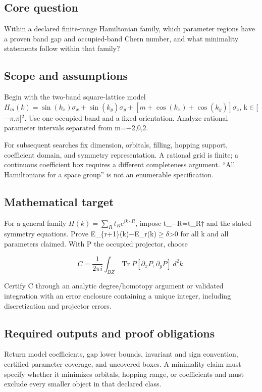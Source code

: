 \documentclass[
  11pt,
]{article}
\begin{document}
\subsection{Core question}

Within a declared finite-range Hamiltonian family, which parameter
regions have a proven band gap and occupied-band Chern number, and what
minimality statements follow within that family?

\subsection{Scope and assumptions}

Begin with the two-band square-lattice model
\(H_m(k)=\sin(k_x)\sigma_x+\sin(k_y)\sigma_y+[m+\cos(k_x)+\cos(k_y)]\sigma_z\),
k\ensuremath{\in}[\ensuremath{-}\ensuremath{\pi},\ensuremath{\pi}]\ensuremath{{}^{2}}.
Use one occupied band and a fixed orientation. Analyze rational
parameter intervals separated from m=\ensuremath{-}2,0,2.

For subsequent searches fix dimension, orbitals, filling, hopping
support, coefficient domain, and symmetry representation. A rational
grid is finite; a continuous coefficient box requires a different
completeness argument. ``All Hamiltonians for a space group'' is not an
enumerable specification.

\subsection{Mathematical target}

For a general family \(H(k)=\sum_R t_Re^{ik\cdot R}\), impose
t\_\ensuremath{-}R=t\_R\ensuremath{\dagger} and the stated symmetry
equations. Prove
E\_\{r+1\}(k)\ensuremath{-}E\_r(k)\ensuremath{\ge}\ensuremath{\delta}>0
for all k and all parameters claimed. With P the occupied projector,
choose

\[C=\frac{1}{2\pi i}\int_{BZ}\operatorname{Tr}P[\partial _xP,\partial _yP]\,d^{2}k.\]

Certify C through an analytic degree/homotopy argument or validated
integration with an error enclosure containing a unique integer,
including discretization and projector errors.

\subsection{Required outputs and proof obligations}

Return model coefficients, gap lower bounds, invariant and sign
convention, certified parameter coverage, and uncovered boxes. A
minimality claim must specify whether it minimizes orbitals, hopping
range, or coefficients and must exclude every smaller object in that
declared class.
\end{document}
